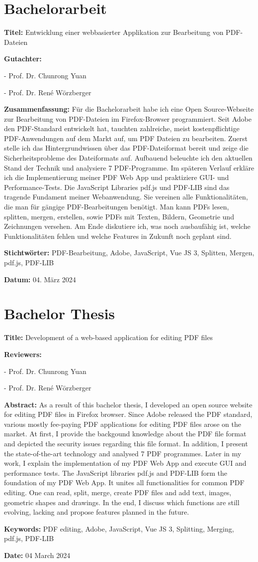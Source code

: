 \chapter*{Bachelorarbeit}
\label{chap:zusammenfassung}
%
\textbf{Titel:} Entwicklung einer webbasierter Applikation zur Bearbeitung von PDF-Dateien

\textbf{Gutachter:}
\par
- Prof. Dr. Chunrong Yuan
\par
- Prof. Dr. René Wörzberger

\textbf{Zusammenfassung:} Für die Bachelorarbeit habe ich eine Open Source-Webseite zur Bearbeitung von PDF-Dateien im Firefox-Browser programmiert. Seit Adobe den PDF-Standard entwickelt hat, tauchten zahlreiche, meist kostenpflichtige PDF-Anwendungen auf dem Markt auf, um PDF Dateien zu bearbeiten. Zuerst stelle ich das Hintergrundwissen über das PDF-Dateiformat bereit und zeige die Sicherheitsprobleme des Dateiformats auf. Aufbauend beleuchte ich den aktuellen Stand der Technik und analysiere 7 PDF-Programme. Im späteren Verlauf erkläre ich die Implementierung meiner PDF Web App und praktiziere GUI- und Performance-Tests. Die JavaScript Libraries pdf.js und PDF-LIB sind das tragende Fundament meiner Webanwendung. Sie vereinen alle Funktionalitäten, die man für gängige PDF-Bearbeitungen benötigt. Man kann PDFs lesen, splitten, mergen, erstellen, sowie PDFs mit Texten, Bildern, Geometrie und Zeichnungen versehen. Am Ende diskutiere ich, was noch ausbaufähig ist, welche Funktionalitäten fehlen und welche Features in Zukunft noch geplant sind.

\textbf{Stichtwörter:} PDF-Bearbeitung, Adobe, JavaScript, Vue JS 3, Splitten, Mergen, pdf.js, PDF-LIB

\textbf{Datum:} 04. März 2024


\newpage
\chapter*{Bachelor Thesis}
\label{chap:abstract}
%
\textbf{Title:} Development of a web-based application for editing PDF files

\textbf{Reviewers:}
\par
- Prof. Dr. Chunrong Yuan
\par
- Prof. Dr. René Wörzberger

\textbf{Abstract:} As a result of this bachelor thesis, I developed an open source website for editing PDF files in Firefox browser. Since Adobe released the PDF standard, various mostly fee-paying PDF applications for editing PDF files arose on the market. At first, I provide the backgound knowledge about the PDF file format and depicted the security issues regarding this file format. In addition, I present the state-of-the-art technology and analysed 7 PDF programmes. Later in my work, I explain the implementation of my PDF Web App and execute GUI and performance tests. The JavaScript libraries pdf.js and PDF-LIB form the foundation of my PDF Web App. It unites all functionalities for common PDF editing. One can read, split, merge, create PDF files and add text, images, geometric shapes and drawings. In the end, I discuss which functions are still evolving, lacking and propose features planned in the future.

\textbf{Keywords:} PDF editing, Adobe, JavaScript, Vue JS 3, Splitting, Merging, pdf.js, PDF-LIB

\textbf{Date:} 04 March 2024